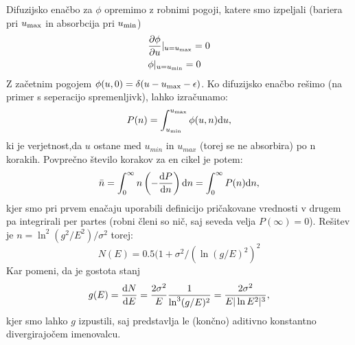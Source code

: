 Difuzijsko enačbo za $\phi$ opremimo z robnimi pogoji, katere smo izpeljali (bariera pri $u_{\textup{max}}$ in absorbcija pri $u_{\textup{min}}$)
\begin{align}
& \frac{\partial \phi}{\partial u} \vert_{u = u_{\textup{max}}} = 0 \\
& \phi \vert_{u = u_{\textup{min}}} = 0
\end{align}
Z začetnim pogojem $\phi (u, 0) = \delta ( u - u_{\textup{max}} - \epsilon)$.
Ko difuzijsko enačbo rešimo (na primer s seperacijo spremenljivk), lahko izračunamo:
\begin{equation}
P(n) = \int_{u_{\textup{min}}}^{u_{\textup{max}}} \phi(u,n) \textup{d} u,
\end{equation}
ki je verjetnost,da $u$ ostane med $u_{min}$ in $u_{max}$ (torej se ne absorbira) po n korakih.
Povprečno število korakov za en cikel je potem:
\begin{equation}
\bar{n} = \int_0^\infty n \left( - \frac{ \textup{d} P}{\textup{d} n} \right) \textup{d} n = \int_0^\infty P(n) \textup{d} n,
\end{equation}
kjer smo pri prvem enačaju uporabili definicijo pričakovane vrednosti v drugem pa integrirali per partes (robni členi so nič, saj seveda velja $P(\infty) = 0$).
Rešitev je $n =  \ln^2(g^2/E^2) / \sigma^2$ torej:
\begin{equation}
N(E) = 0.5 (1 + \sigma^2 / (\ln (g/E)^2)^2
\end{equation}
Kar pomeni, da je gostota stanj
\begin{equation}
g(E) = \frac{\textup{d} N}{\textup{d} E} = \frac{2 \sigma^2}{E} \frac{1}{\ln^3 (g/E)^2} = \frac{2 \sigma^2}{E |\ln E^2|^3},
\end{equation}
kjer smo lahko $g$ izpustili, saj predstavlja le (končno) aditivno konstantno divergirajočem imenovalcu.

